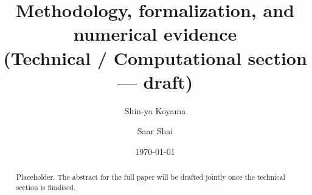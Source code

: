 \documentclass[11pt]{amsart}
\title[Technical / Computational section]{Methodology, formalization, and numerical evidence \\
       \large (Technical / Computational section --- draft)}
\author{Shin-ya Koyama \and Saar Shai}
\date{\today}
\theoremstyle{definition}
\begin{document}
\maketitle

\begin{abstract}
Placeholder. The abstract for the full paper will be drafted jointly
once the technical section is finalised.
\end{abstract}



\appendix



\printbibliography
\end{document}
